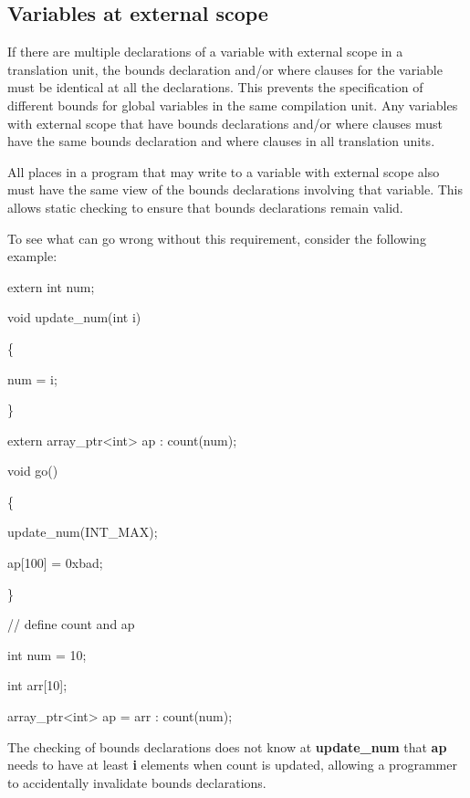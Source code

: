 \documentclass[]{article}
\begin{document}
\subsection{\texorpdfstring{\protect\hypertarget{ux5fToc435434935}{}{\protect\hypertarget{ux5fToc437460756}{}{\protect\hypertarget{ux5fToc440445434}{}{\protect\hypertarget{ux5fToc440449216}{}{\protect\hypertarget{ux5fToc440551866}{}{}}}}}Variables
at external
scope}{Variables at external scope}}\label{variables-at-external-scope}

If there are multiple declarations of a variable with external scope in
a translation unit, the bounds declaration and/or where clauses for the
variable must be identical at all the declarations. This prevents the
specification of different bounds for global variables in the same
compilation unit. Any variables with external scope that have bounds
declarations and/or where clauses must have the same bounds declaration
and where clauses in all translation units.

All places in a program that may write to a variable with external scope
also must have the same view of the bounds declarations involving that
variable. This allows static checking to ensure that bounds declarations
remain valid.

To see what can go wrong without this requirement, consider the
following example:

extern int num;

void update\_num(int i)

\{

num = i;

\}

extern array\_ptr\textless{}int\textgreater{} ap : count(num);

void go()

\{

update\_num(INT\_MAX);

ap{[}100{]} = 0xbad;

\}

// define count and ap

int num = 10;

int arr{[}10{]};

array\_ptr\textless{}int\textgreater{} ap = arr : count(num);

The checking of bounds declarations does not know at
\textbf{update\_num} that \textbf{ap} needs to have at least \textbf{i}
elements when count is updated, allowing a programmer to accidentally
invalidate bounds declarations.
\end{document}
